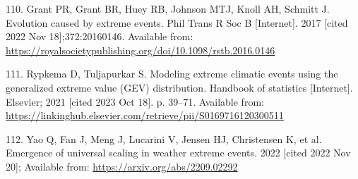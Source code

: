 \documentclass[
  12pt,
]{article}
\newlength{\cslhangindent}
\newenvironment{CSLReferences}[2] %
 {\begin{list}{}{%
  \setlength{\itemindent}{0pt}
  \setlength{\leftmargin}{0pt}
  \setlength{\parsep}{0pt}
  \ifodd #1
   \setlength{\leftmargin}{\cslhangindent}
   \setlength{\itemindent}{-1\cslhangindent}
  \fi
  \setlength{\itemsep}{#2\baselineskip}}}
 {\end{list}}
\begin{document}
\begin{CSLReferences}{0}{1}
110. Grant PR, Grant BR, Huey RB, Johnson MTJ, Knoll AH, Schmitt J. Evolution caused by extreme events. Phil Trans R Soc B {[}Internet{]}. 2017 {[}cited 2022 Nov 18{]};372:20160146. Available from: \url{https://royalsocietypublishing.org/doi/10.1098/rstb.2016.0146}

111. Rypkema D, Tuljapurkar S. Modeling extreme climatic events using the generalized extreme value ({GEV}) distribution. Handbook of statistics {[}Internet{]}. Elsevier; 2021 {[}cited 2023 Oct 18{]}. p. 39--71. Available from: \url{https://linkinghub.elsevier.com/retrieve/pii/S0169716120300511}

112. Yao Q, Fan J, Meng J, Lucarini V, Jensen HJ, Christensen K, et al. Emergence of universal scaling in weather extreme events. 2022 {[}cited 2022 Nov 20{]}; Available from: \url{https://arxiv.org/abs/2209.02292}

\end{CSLReferences}
\end{document}
